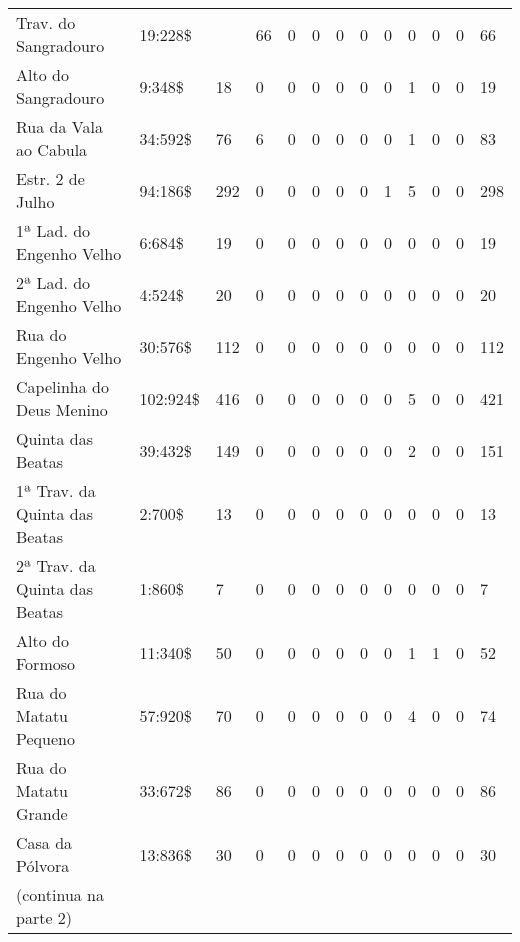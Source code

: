 \begin{table}
{\begin{minipage}{\textwidth}
\begin{tiny}
\begin{tabular}{m{} m{1cm} m{} m{} m{} m{} m{} m{} m{} m{} m{} m{} m{}}
Trav. do Sangradouro						&19:228\$	&	&66	&0	&0	&0	&0	&0	&0	&0	&0	&66\\
Alto do Sangradouro						&9:348\$	&18	&0	&0	&0	&0	&0	&0	&1	&0	&0	&19\\
Rua da Vala ao Cabula						&34:592\$	&76	&6	&0	&0	&0	&0	&0	&1	&0	&0	&83\\
Estr. 2 de Julho						&94:186\$	&292	&0	&0	&0	&0	&0	&1	&5	&0	&0	&298\\
1ª Lad. do Engenho Velho					&6:684\$	&19	&0	&0	&0	&0	&0	&0	&0	&0	&0	&19\\
2ª Lad. do Engenho Velho					&4:524\$	&20	&0	&0	&0	&0	&0	&0	&0	&0	&0	&20\\
Rua do Engenho Velho						&30:576\$	&112	&0	&0	&0	&0	&0	&0	&0	&0	&0	&112\\
Capelinha do Deus Menino					&102:924\$	&416	&0	&0	&0	&0	&0	&0	&5	&0	&0	&421\\
Quinta das Beatas						&39:432\$	&149	&0	&0	&0	&0	&0	&0	&2	&0	&0	&151\\
1ª Trav. da Quinta das Beatas				&2:700\$	&13	&0	&0	&0	&0	&0	&0	&0	&0	&0	&13\\
2ª Trav. da Quinta das Beatas				&1:860\$	&7	&0	&0	&0	&0	&0	&0	&0	&0	&0	&7\\
Alto do Formoso							&11:340\$	&50	&0	&0	&0	&0	&0	&0	&1	&1	&0	&52\\
Rua do Matatu Pequeno						&57:920\$	&70	&0	&0	&0	&0	&0	&0	&4	&0	&0	&74\\
Rua do Matatu Grande						&33:672\$	&86	&0	&0	&0	&0	&0	&0	&0	&0	&0	&86\\
Casa da Pólvora							&13:836\$	&30	&0	&0	&0	&0	&0	&0	&0	&0	&0	&30\\
\hline
(continua na parte 2) & & & & & & & & & & & & \\
\end{tabular} 
\end{tiny}
\end{minipage}
}
{}
\end{table}